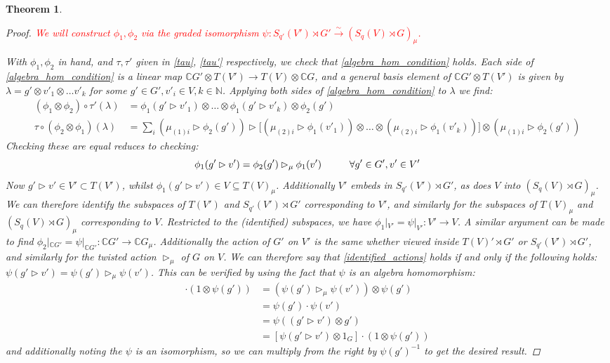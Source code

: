 \documentclass[10pt]{article}
\newcommand{\bb}{\medbreak}
\newcommand{\nt}{\noindent}
\newcommand{\N}{\mathbb{N}}
\newcommand{\Cc }{\mathbb{C}}
\newcommand{\xrt}{\xrightarrow}
\newtheorem{theorem}[lemma]{Theorem}
\theoremstyle{definition}
\begin{document}
\begin{theorem}
\begin{proof}
\nt \textcolor{red}{We will construct $\phi_1,\phi_2$ via the graded isomorphism $\psi:S_{q'}(V')\rtimes G'\xrt{\sim} (S_q(V)\rtimes G)_\mu$.}\bb

\nt With $\phi_1,\phi_2$ in hand, and $\tau,\tau'$ given in \eqref{tau}, \eqref{tau'} respectively, we check that \eqref{algebra_hom_condition} holds. Each side of \eqref{algebra_hom_condition} is a linear map $\Cc  G'\otimes T(V')\rightarrow T(V)\otimes \Cc  G$, and a general basis element of $\Cc  G'\otimes T(V')$ is given by $\lambda=g'\otimes v'_1\otimes \dots v'_k$ for some $g'\in G', v'_i\in V, k\in \N$. %
Applying both sides of \eqref{algebra_hom_condition} to $\lambda$ we find:
\begin{align*}
(\phi_1\otimes\phi_2)\circ \tau'(\lambda) & = \phi_1(g'\rhd v'_1)\otimes \dots \otimes \phi_1(g'\rhd v'_k)\otimes \phi_2(g')\\
\tau\circ (\phi_2\otimes \phi_1)(\lambda) & = \sum_i 
   (\mu_{(1)i}\rhd \phi_2(g'))\rhd \big[(\mu_{(2)i}\rhd \phi_1(v'_1))\otimes \dots \otimes (\mu_{(2)i}\rhd \phi_1(v'_k))\big] \otimes (\mu_{(1)i}\rhd \phi_2(g'))
\end{align*}
Checking these are equal reduces to checking:
\begin{equation}\label{identified_actions}
\phi_1(g'\rhd v')=\phi_2(g')\rhd_\mu \phi_1(v')\hspace*{1cm}\forall g'\in G',v'\in V'
\end{equation}
Now $g'\rhd v'\in V'\subset T(V')$, whilst $\phi_1(g'\rhd v')\in V\subseteq T(V)_\mu$. Additionally $V'$ embeds in $S_{q'}(V')\rtimes G'$, as does $V$ into $(S_q(V)\rtimes G)_\mu$. We can therefore identify the subspaces of $T(V')$ and $S_{q'}(V')\rtimes G'$ corresponding to $V'$, and similarly for the subspaces of $T(V)_\mu$ and $(S_q(V)\rtimes G)_\mu$ corresponding to $V$. Restricted to the (identified) subspaces, we have $\phi_1|_{V'}=\psi|_{V'}:V'\rightarrow V$. A similar argument can be made to find $\phi_2|_{\Cc G'}=\psi|_{\Cc G'}:\Cc G'\rightarrow \Cc G_\mu$. Additionally the action of $G'$ on $V'$ is the same whether viewed inside $T(V)'\rtimes G'$ or $S_{q'}(V')\rtimes G'$, and similarly for the twisted action $\rhd_\mu$ of $G$ on $V$. We can therefore say that \eqref{identified_actions} holds if and only if the following holds: $\psi(g'\rhd v')=\psi(g')\rhd_\mu \psi(v')$. This can be verified by using the fact that $\psi$ is an algebra homomorphism:
\begin{align*}
[(\psi(g')\rhd_\mu \psi(v'))\otimes 1_G]\cdot (1\otimes \psi(g')) & =(\psi(g')\rhd_\mu \psi(v'))\otimes \psi(g')\\
& = \psi(g')\cdot \psi(v')\\
& = \psi((g'\rhd v')\otimes g')\\
& = [\psi(g'\rhd v')\otimes 1_G]\cdot (1\otimes \psi(g'))
\end{align*}
and additionally noting the $\psi$ is an isomorphism, so we can multiply from the right by $\psi(g')^{-1}$ to get the desired result. 


\end{proof}
\end{theorem}
\end{document}
